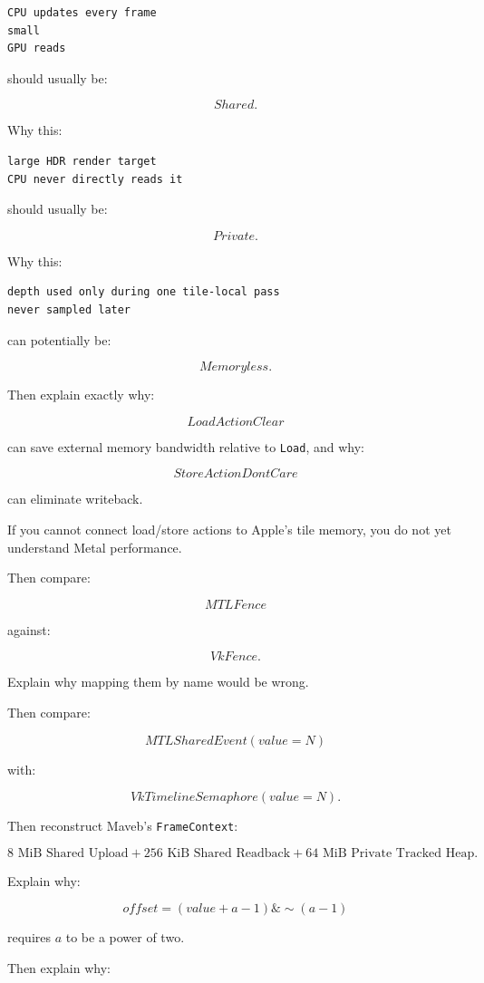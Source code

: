 \begin{verbatim}
CPU updates every frame
small
GPU reads
\end{verbatim}

should usually be:

\[
Shared.
\]

Why this:

\begin{verbatim}
large HDR render target
CPU never directly reads it
\end{verbatim}

should usually be:

\[
Private.
\]

Why this:

\begin{verbatim}
depth used only during one tile-local pass
never sampled later
\end{verbatim}

can potentially be:

\[
Memoryless.
\]

Then explain exactly why:

\[
LoadActionClear
\]

can save external memory bandwidth relative to \texttt{Load}, and why:

\[
StoreActionDontCare
\]

can eliminate writeback.

If you cannot connect load/store actions to Apple's tile memory, you do not yet understand Metal performance.

Then compare:

\[
MTLFence
\]

against:

\[
VkFence.
\]

Explain why mapping them by name would be wrong.

Then compare:

\[
MTLSharedEvent(value=N)
\]

with:

\[
VkTimelineSemaphore(value=N).
\]

Then reconstruct Maveb's \texttt{FrameContext}:

\[
8\text{ MiB Shared Upload}
+
256\text{ KiB Shared Readback}
+
64\text{ MiB Private Tracked Heap}.
\]

Explain why:

\[
offset=
(value+a-1)\&
\sim(a-1)
\]

requires \(a\) to be a power of two.

Then explain why:


